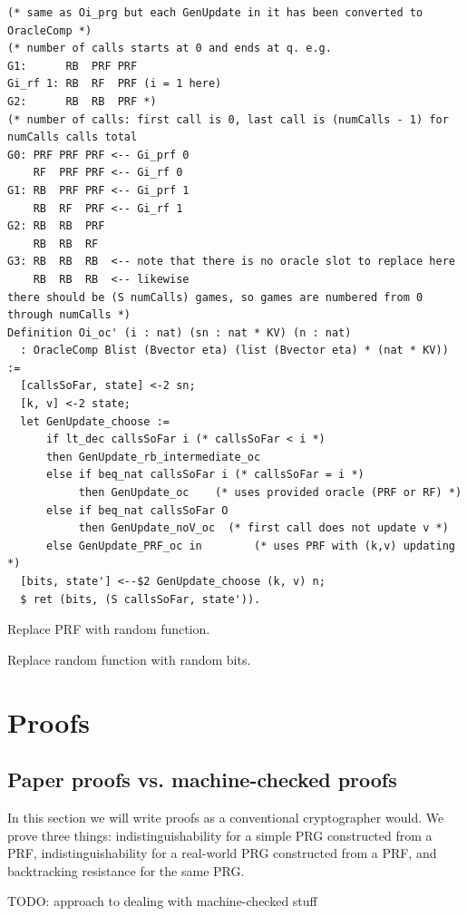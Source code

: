 \documentclass[12pt,lot, lof]{puthesis}
\begin{document}
{\begin{lstlisting}
(* same as Oi_prg but each GenUpdate in it has been converted to OracleComp *)
(* number of calls starts at 0 and ends at q. e.g.
G1:      RB  PRF PRF
Gi_rf 1: RB  RF  PRF (i = 1 here)
G2:      RB  RB  PRF *)
(* number of calls: first call is 0, last call is (numCalls - 1) for numCalls calls total
G0: PRF PRF PRF <-- Gi_prf 0
    RF  PRF PRF <-- Gi_rf 0
G1: RB  PRF PRF <-- Gi_prf 1
    RB  RF  PRF <-- Gi_rf 1
G2: RB  RB  PRF
    RB  RB  RF
G3: RB  RB  RB  <-- note that there is no oracle slot to replace here
    RB  RB  RB  <-- likewise
there should be (S numCalls) games, so games are numbered from 0 through numCalls *)
Definition Oi_oc' (i : nat) (sn : nat * KV) (n : nat) 
  : OracleComp Blist (Bvector eta) (list (Bvector eta) * (nat * KV)) :=
  [callsSoFar, state] <-2 sn;
  [k, v] <-2 state;
  let GenUpdate_choose := 
      if lt_dec callsSoFar i (* callsSoFar < i *)
      then GenUpdate_rb_intermediate_oc
      else if beq_nat callsSoFar i (* callsSoFar = i *)
           then GenUpdate_oc    (* uses provided oracle (PRF or RF) *)
      else if beq_nat callsSoFar O 
           then GenUpdate_noV_oc  (* first call does not update v *)
      else GenUpdate_PRF_oc in        (* uses PRF with (k,v) updating *)
  [bits, state'] <--$2 GenUpdate_choose (k, v) n;
  $ ret (bits, (S callsSoFar, state')).
  \end{lstlisting}

Replace PRF with random function.

Replace random function with random bits.


\chapter{Proofs}

\section{Paper proofs vs. machine-checked proofs}

In this section we will write proofs as a conventional cryptographer would. We prove three things: indistinguishability for a simple PRG constructed from a PRF, indistinguishability for a real-world PRG constructed from a PRF, and backtracking resistance for the same PRG.

TODO: approach to dealing with machine-checked stuff

}
\end{document}
